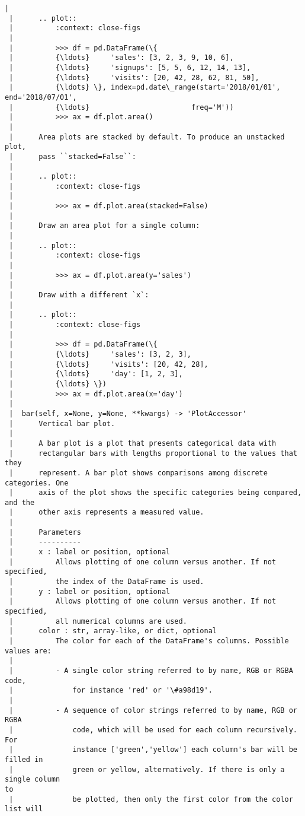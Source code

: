 \documentclass[11pt]{article}
\begin{document}
\begin{Verbatim}[commandchars=\\\{\}]
 |
 |      .. plot::
 |          :context: close-figs
 |
 |          >>> df = pd.DataFrame(\{
 |          {\ldots}     'sales': [3, 2, 3, 9, 10, 6],
 |          {\ldots}     'signups': [5, 5, 6, 12, 14, 13],
 |          {\ldots}     'visits': [20, 42, 28, 62, 81, 50],
 |          {\ldots} \}, index=pd.date\_range(start='2018/01/01', end='2018/07/01',
 |          {\ldots}                        freq='M'))
 |          >>> ax = df.plot.area()
 |
 |      Area plots are stacked by default. To produce an unstacked plot,
 |      pass ``stacked=False``:
 |
 |      .. plot::
 |          :context: close-figs
 |
 |          >>> ax = df.plot.area(stacked=False)
 |
 |      Draw an area plot for a single column:
 |
 |      .. plot::
 |          :context: close-figs
 |
 |          >>> ax = df.plot.area(y='sales')
 |
 |      Draw with a different `x`:
 |
 |      .. plot::
 |          :context: close-figs
 |
 |          >>> df = pd.DataFrame(\{
 |          {\ldots}     'sales': [3, 2, 3],
 |          {\ldots}     'visits': [20, 42, 28],
 |          {\ldots}     'day': [1, 2, 3],
 |          {\ldots} \})
 |          >>> ax = df.plot.area(x='day')
 |
 |  bar(self, x=None, y=None, **kwargs) -> 'PlotAccessor'
 |      Vertical bar plot.
 |
 |      A bar plot is a plot that presents categorical data with
 |      rectangular bars with lengths proportional to the values that they
 |      represent. A bar plot shows comparisons among discrete categories. One
 |      axis of the plot shows the specific categories being compared, and the
 |      other axis represents a measured value.
 |
 |      Parameters
 |      ----------
 |      x : label or position, optional
 |          Allows plotting of one column versus another. If not specified,
 |          the index of the DataFrame is used.
 |      y : label or position, optional
 |          Allows plotting of one column versus another. If not specified,
 |          all numerical columns are used.
 |      color : str, array-like, or dict, optional
 |          The color for each of the DataFrame's columns. Possible values are:
 |
 |          - A single color string referred to by name, RGB or RGBA code,
 |              for instance 'red' or '\#a98d19'.
 |
 |          - A sequence of color strings referred to by name, RGB or RGBA
 |              code, which will be used for each column recursively. For
 |              instance ['green','yellow'] each column's bar will be filled in
 |              green or yellow, alternatively. If there is only a single column
to
 |              be plotted, then only the first color from the color list will

\end{Verbatim}
\end{document}
